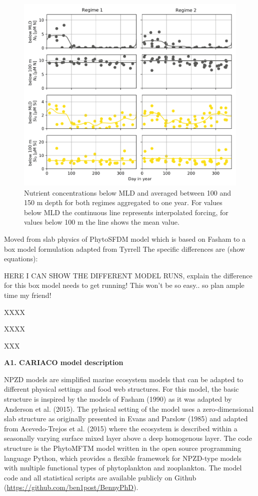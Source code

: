 \begin{figure}
\centering
\includegraphics[trim = 0mm 0mm 0mm 0mm, clip, width=0.68\linewidth]{./Chp2-Pre/NutsBELOWmldAsset1011.png}
\caption[Scheme]{\small {Nutrient concentrations below MLD and averaged between 100 and 150 m depth for both regimes aggregated to one year. For values below MLD the continuous line represents interpolated forcing, for values below 100 m the line shows the mean value.}}
\label{BelowMLD}
\end{figure}

Moved from slab physics of PhytoSFDM model \citep{Acevedo-Trejos2016} which is based on Fasham \citep{Evans2003,Fasham1990a} to a box model formulation adapted from Tyrrell \citep{Tyrrell1999}
The specific differences are (show equations):

HERE I CAN SHOW THE DIFFERENT MODEL RUNS, explain the difference
for this box model needs to get running! This won't be so easy.. so plan ample time my friend!

XXXX

XXXX

XXX

{\bf {\large A1. CARIACO model description}} 

NPZD models are simplified marine ecosystem models that can be adapted to different physical settings and food web structures. For this model, the basic structure is inspired by the models of Fasham (1990) as it was adapted by Anderson et al. (2015). The pyhsical setting of the model uses a zero-dimensional slab structure as originally presented in Evans and Parslow (1985) and adapted from Acevedo-Trejos et al. (2015) where the ecosystem is described within a seasonally varying surface mixed layer above a deep homogenous layer. The code structure is the PhytoMFTM model written in the open source programming language Python, which provides a flexible framework for NPZD-type models with multiple functional types of phytoplankton and zooplankton. The model code and all statistical scripts are available publicly on Github (\url{https://github.com/ben1post/BennyPhD}).

